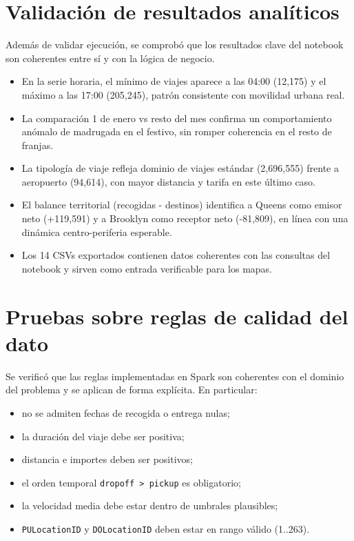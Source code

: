 \section{Validación de resultados analíticos}
Además de validar ejecución, se comprobó que los resultados clave del notebook son
coherentes entre sí y con la lógica de negocio.

\begin{itemize}
\item En la serie horaria, el mínimo de viajes aparece a las 04:00 (12{,}175) y el
máximo a las 17:00 (205{,}245), patrón consistente con movilidad urbana real.
\item La comparación 1 de enero vs resto del mes confirma un comportamiento anómalo
de madrugada en el festivo, sin romper coherencia en el resto de franjas.
\item La tipología de viaje refleja dominio de viajes estándar
(2{,}696{,}555) frente a aeropuerto (94{,}614), con mayor distancia y tarifa en este
último caso.
\item El balance territorial (recogidas - destinos) identifica a Queens como emisor
neto (+119{,}591) y a Brooklyn como receptor neto (-81{,}809), en línea con una
dinámica centro-periferia esperable.
\item Los 14 CSVs exportados contienen datos coherentes con las consultas del notebook
y sirven como entrada verificable para los mapas.
\end{itemize}

\section{Pruebas sobre reglas de calidad del dato}
Se verificó que las reglas implementadas en Spark son coherentes con el dominio
del problema y se aplican de forma explícita. En particular:

\begin{itemize}
	\item no se admiten fechas de recogida o entrega nulas;
	\item la duración del viaje debe ser positiva;
	\item distancia e importes deben ser positivos;
	\item el orden temporal \texttt{dropoff > pickup} es obligatorio;
	\item la velocidad media debe estar dentro de umbrales plausibles;
	\item \texttt{PULocationID} y \texttt{DOLocationID} deben estar en rango
	válido (1..263).
\end{itemize}

